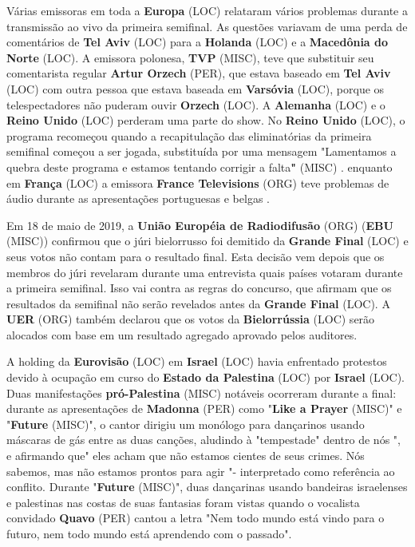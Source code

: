 \documentclass[12pt,a4paper]{article}
\begin{document}
Várias emissoras em toda a \textbf{Europa} (LOC) relataram vários problemas durante a transmissão ao vivo da primeira semifinal. As questões variavam de uma perda de comentários de \textbf{Tel Aviv} (LOC) para a \textbf{Holanda} (LOC) e a \textbf{Macedônia do Norte} (LOC). A emissora polonesa, \textbf{TVP} (MISC), teve que substituir seu comentarista regular \textbf{Artur Orzech} (PER), que estava baseado em \textbf{Tel Aviv} (LOC) com outra pessoa que estava baseada em \textbf{Varsóvia} (LOC), porque os telespectadores não puderam ouvir \textbf{Orzech} (LOC). A \textbf{Alemanha} (LOC) e o \textbf{Reino Unido} (LOC) perderam uma parte do show. No \textbf{Reino Unido} (LOC), o programa recomeçou quando a recapitulação das eliminatórias da primeira semifinal começou a ser jogada, substituída por uma mensagem "Lamentamos a quebra deste programa e estamos tentando corrigir a falta\textbf{"} (MISC) . enquanto em \textbf{França} (LOC) a emissora \textbf{France Televisions} (ORG) teve problemas de áudio durante as apresentações portuguesas e belgas .

Em 18 de maio de 2019, a \textbf{União Européia de Radiodifusão} (ORG) (\textbf{EBU} (MISC)) confirmou que o júri bielorrusso foi demitido da \textbf{Grande Final} (LOC) e seus votos não contam para o resultado final. Esta decisão vem depois que os membros do júri revelaram durante uma entrevista quais países votaram durante a primeira semifinal. Isso vai contra as regras do concurso, que afirmam que os resultados da semifinal não serão revelados antes da \textbf{Grande Final} (LOC). A \textbf{UER} (ORG) também declarou que os votos da \textbf{Bielorrússia} (LOC) serão alocados com base em um resultado agregado aprovado pelos auditores.

A holding da \textbf{Eurovisão} (LOC) em \textbf{Israel} (LOC) havia enfrentado protestos devido à ocupação em curso do \textbf{Estado da Palestina} (LOC) por \textbf{Israel} (LOC). Duas manifestações \textbf{pró-Palestina} (MISC) notáveis ocorreram durante a final: durante as apresentações de \textbf{Madonna} (PER) como "\textbf{Like a Prayer} (MISC)" e "\textbf{Future} (MISC)", o cantor dirigiu um monólogo para dançarinos usando máscaras de gás entre as duas canções, aludindo à "tempestade" dentro de nós ", e afirmando que" eles acham que não estamos cientes de seus crimes. Nós sabemos, mas não estamos prontos para agir "- interpretado como referência ao conflito. Durante "\textbf{Future} (MISC)", duas dançarinas usando bandeiras israelenses e palestinas nas costas de suas fantasias foram vistas quando o vocalista convidado \textbf{Quavo} (PER) cantou a letra "Nem todo mundo está vindo para o futuro, nem todo mundo está aprendendo com o passado".
\end{document}
